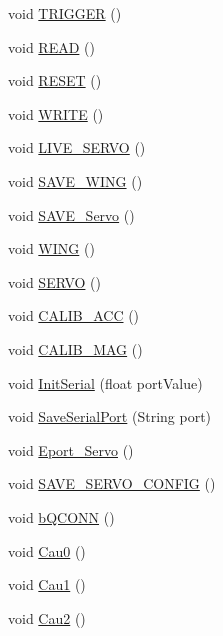 \begin{DoxyCompactItemize}
void \hyperlink{classMultiWiiConf_a7707921bbef91c191fcf7b9b57707c7b}{T\-R\-I\-G\-G\-E\-R} ()
\item 
void \hyperlink{classMultiWiiConf_a2c5626b2259e329d5501da2609875c19}{R\-E\-A\-D} ()
\item 
void \hyperlink{classMultiWiiConf_a51b5f517a679dd129e8226cdfbd1d052}{R\-E\-S\-E\-T} ()
\item 
void \hyperlink{classMultiWiiConf_a3de7c01db79331e4ae6d75ddab9eedcc}{W\-R\-I\-T\-E} ()
\item 
void \hyperlink{classMultiWiiConf_aea8b2d0db9fb1ba3c1f83bf339e13573}{L\-I\-V\-E\-\_\-\-S\-E\-R\-V\-O} ()
\item 
void \hyperlink{classMultiWiiConf_acc41b4d048f1bafd56534ed2b69ff790}{S\-A\-V\-E\-\_\-\-W\-I\-N\-G} ()
\item 
void \hyperlink{classMultiWiiConf_aff39ce24b10a21b47f19007bc1548463}{S\-A\-V\-E\-\_\-\-Servo} ()
\item 
void \hyperlink{classMultiWiiConf_a56dbe3488934b1cd45fe8d85f810383a}{W\-I\-N\-G} ()
\item 
void \hyperlink{classMultiWiiConf_a86f14ce1d6f3832a8566674b79439a29}{S\-E\-R\-V\-O} ()
\item 
void \hyperlink{classMultiWiiConf_afcaa86ab6487c949b55d21a09233cd6d}{C\-A\-L\-I\-B\-\_\-\-A\-C\-C} ()
\item 
void \hyperlink{classMultiWiiConf_a53f8586a159a0771380e69bf2fe4a03d}{C\-A\-L\-I\-B\-\_\-\-M\-A\-G} ()
\item 
void \hyperlink{classMultiWiiConf_ad3b31ce5a10521c304a47aee0b63035f}{Init\-Serial} (float port\-Value)
\item 
void \hyperlink{classMultiWiiConf_ad0685ad60f2ab83d769fee5aaa597950}{Save\-Serial\-Port} (String port)
\item 
void \hyperlink{classMultiWiiConf_a42a4b3766358fb85ef2da8be3cff0b85}{Eport\-\_\-\-Servo} ()
\item 
void \hyperlink{classMultiWiiConf_accbc975f7d37014059827e3cd9e8f787}{S\-A\-V\-E\-\_\-\-S\-E\-R\-V\-O\-\_\-\-C\-O\-N\-F\-I\-G} ()
\item 
void \hyperlink{classMultiWiiConf_ac97009142868c50faca724fb1e138ea1}{b\-Q\-C\-O\-N\-N} ()
\item 
void \hyperlink{classMultiWiiConf_af7c440cc4348b741e7c0129912ab02b6}{Cau0} ()
\item 
void \hyperlink{classMultiWiiConf_aed32c4524c48488a9cb7996bf18f87c2}{Cau1} ()
\item 
void \hyperlink{classMultiWiiConf_ac0581f16afefe73eda1d9fd3c49619e9}{Cau2} ()

\end{DoxyCompactItemize}
